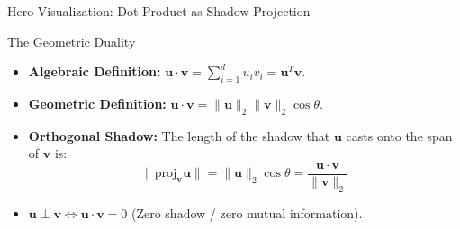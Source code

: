 \documentclass[../m00-session-02.tex]{subfiles}
\begin{document}
\begin{frame}{Hero Visualization: Dot Product as Shadow Projection}
{%
  }{The Geometric Duality}{%
    \begin{itemize}\setlength{\itemsep}{0.25em}
      \item \textbf{Algebraic Definition:} $\mathbf{u} \cdot \mathbf{v} = \sum_{i=1}^d u_i v_i = \mathbf{u}^T \mathbf{v}$.
      \item \textbf{Geometric Definition:} $\mathbf{u} \cdot \mathbf{v} = \|\mathbf{u}\|_2 \|\mathbf{v}\|_2 \cos\theta$.
      \item \textbf{Orthogonal Shadow:} The length of the shadow that $\mathbf{u}$ casts onto the span of $\mathbf{v}$ is:
        \[
        \|\text{proj}_{\mathbf{v}}\mathbf{u}\| = \|\mathbf{u}\|_2 \cos\theta = \frac{\mathbf{u} \cdot \mathbf{v}}{\|\mathbf{v}\|_2}
        \]
      \item $\mathbf{u} \perp \mathbf{v} \iff \mathbf{u} \cdot \mathbf{v} = 0$ (Zero shadow / zero mutual information).
    \end{itemize}
  }
\end{frame}
\end{document}
